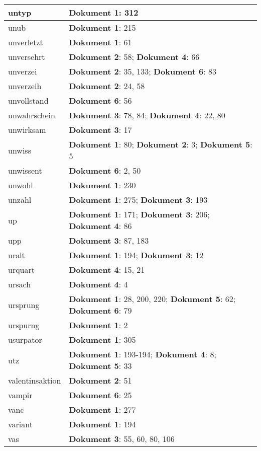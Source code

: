 \documentclass[a5paper]{article}
\begin{document}
\begin{longtable}[l]{|l|p{3in}|}
\hline
untyp & \textbf{Dokument 1}: 312 \\
\hline
unub & \textbf{Dokument 1}: 215 \\
\hline
unverletzt & \textbf{Dokument 1}: 61 \\
\hline
unversehrt & \textbf{Dokument 2}: 58; \textbf{Dokument 4}: 66 \\
\hline
unverzei & \textbf{Dokument 2}: 35, 133; \textbf{Dokument 6}: 83 \\
\hline
unverzeih & \textbf{Dokument 2}: 24, 58 \\
\hline
unvollstand & \textbf{Dokument 6}: 56 \\
\hline
unwahrschein & \textbf{Dokument 3}: 78, 84; \textbf{Dokument 4}: 22, 80 \\
\hline
unwirksam & \textbf{Dokument 3}: 17 \\
\hline
unwiss & \textbf{Dokument 1}: 80; \textbf{Dokument 2}: 3; \textbf{Dokument 5}: 5 \\
\hline
unwissent & \textbf{Dokument 6}: 2, 50 \\
\hline
unwohl & \textbf{Dokument 1}: 230 \\
\hline
unzahl & \textbf{Dokument 1}: 275; \textbf{Dokument 3}: 193 \\
\hline
up & \textbf{Dokument 1}: 171; \textbf{Dokument 3}: 206; \textbf{Dokument 4}: 86 \\
\hline
upp & \textbf{Dokument 3}: 87, 183 \\
\hline
uralt & \textbf{Dokument 1}: 194; \textbf{Dokument 3}: 12 \\
\hline
urquart & \textbf{Dokument 4}: 15, 21 \\
\hline
ursach & \textbf{Dokument 4}: 4 \\
\hline
ursprung & \textbf{Dokument 1}: 28, 200, 220; \textbf{Dokument 5}: 62; \textbf{Dokument 6}: 79 \\
\hline
urspurng & \textbf{Dokument 1}: 2 \\
\hline
usurpator & \textbf{Dokument 1}: 305 \\
\hline
utz & \textbf{Dokument 1}: 193-194; \textbf{Dokument 4}: 8; \textbf{Dokument 5}: 33 \\
\hline
valentinsaktion & \textbf{Dokument 2}: 51 \\
\hline
vampir & \textbf{Dokument 6}: 25 \\
\hline
vanc & \textbf{Dokument 1}: 277 \\
\hline
variant & \textbf{Dokument 1}: 194 \\
\hline
vas & \textbf{Dokument 3}: 55, 60, 80, 106 \\

\end{longtable}
\end{document}
